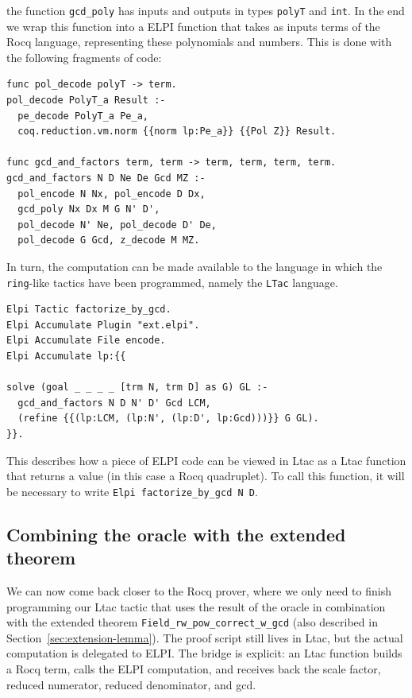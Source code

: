 \documentclass[11pt]{article}
\begin{document}
the function {\tt gcd\_poly} has inputs and outputs in types {\tt polyT} and
{\tt int}.  In the end we wrap this function into a ELPI function that takes
as inputs terms of the Rocq language, representing these polynomials and
numbers.  This is done with the following fragments of code:

\begin{lstlisting}
func pol_decode polyT -> term.
pol_decode PolyT_a Result :-
  pe_decode PolyT_a Pe_a,
  coq.reduction.vm.norm {{norm lp:Pe_a}} {{Pol Z}} Result.

func gcd_and_factors term, term -> term, term, term, term.
gcd_and_factors N D Ne De Gcd MZ :-
  pol_encode N Nx, pol_encode D Dx,
  gcd_poly Nx Dx M G N' D',
  pol_decode N' Ne, pol_decode D' De,
  pol_decode G Gcd, z_decode M MZ.
\end{lstlisting}

In turn, the computation can be made available to the language in which
the {\tt ring}-like tactics have been programmed, namely the {\tt LTac}
language.
\begin{lstlisting}
Elpi Tactic factorize_by_gcd.
Elpi Accumulate Plugin "ext.elpi".
Elpi Accumulate File encode.
Elpi Accumulate lp:{{

solve (goal _ _ _ _ [trm N, trm D] as G) GL :-
  gcd_and_factors N D N' D' Gcd LCM,
  (refine {{(lp:LCM, (lp:N', (lp:D', lp:Gcd)))}} G GL).
}}.
\end{lstlisting}
This describes how a piece of ELPI code can be viewed in Ltac as a Ltac function
that returns a value (in this case a Rocq quadruplet).  To call this function,
it will be necessary to write {\tt Elpi factorize\_by\_gcd N D}.

\subsection{Combining the oracle with the extended theorem}
We can now come back closer to the Rocq prover, where we only need to
finish programming our Ltac tactic that uses the result of the oracle in
combination with the extended theorem {\tt Field\_rw\_pow\_correct\_w\_gcd}
(also described in Section~\ref{sec:extension-lemma}).
The proof script still lives in Ltac, but the actual computation is delegated to
ELPI. The bridge is explicit: an Ltac function builds a Rocq term, calls the
ELPI computation, and receives back the scale factor, reduced numerator, reduced denominator, and gcd.
\end{document}
